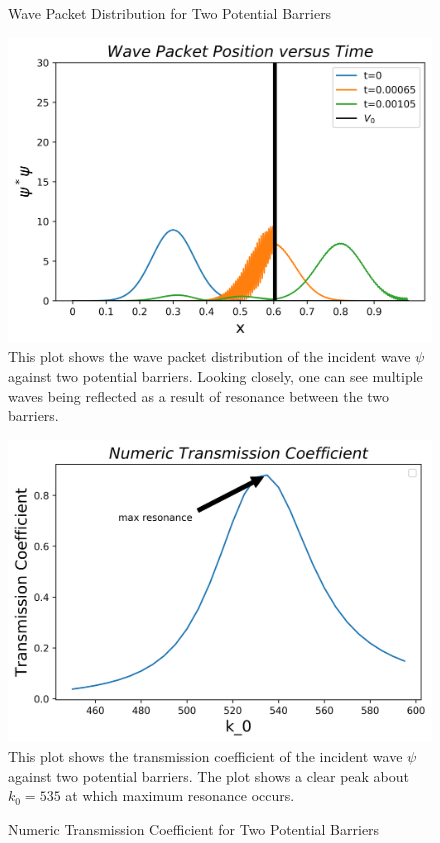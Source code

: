 \documentclass[twocolumn]{article}
\begin{document}
\begin{figure}[H]
\centering
\caption{Wave Packet Distribution for Two Potential Barriers}
\includegraphics[scale=.5]{Position3}
\small{This plot shows the wave packet distribution of the incident wave $\psi$ against two potential barriers. Looking closely, one can see multiple waves being reflected as a result of resonance between the two barriers.}
\centering
\caption{Numeric Transmission Coefficient for Two Potential Barriers}
\includegraphics[scale=.5]{T_numeric}
\small{This plot shows the transmission coefficient of the incident wave $\psi$ against two potential barriers. The plot shows a clear peak about $k_0=535$ at which maximum resonance occurs.}
\end{figure}
\end{document}
